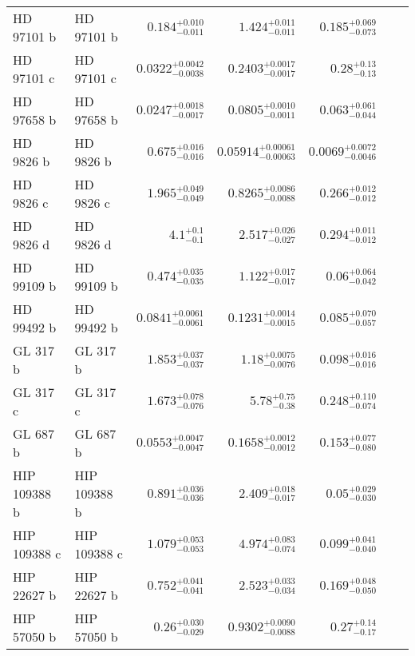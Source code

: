 \begin{longtable*}{llrrrrr}
HD 97101 b & HD 97101 b & $0.184^{+0.010}_{-0.011}$ & $1.424^{+0.011}_{-0.011}$ & $0.185^{+0.069}_{-0.073}$ & \cite{Dedrick et al. in prep} & \\ 
HD 97101 c & HD 97101 c & $0.0322^{+0.0042}_{-0.0038}$ & $0.2403^{+0.0017}_{-0.0017}$ & $0.28^{+0.13}_{-0.13}$ & \cite{Dedrick et al. in prep} & \\ 
HD 97658 b & HD 97658 b & $0.0247^{+0.0018}_{-0.0017}$ & $0.0805^{+0.0010}_{-0.0011}$ & $0.063^{+0.061}_{-0.044}$ & \cite{Howard11} & \\ 
HD 9826 b & HD 9826 b & $0.675^{+0.016}_{-0.016}$ & $0.05914^{+0.00061}_{-0.00063}$ & $0.0069^{+0.0072}_{-0.0046}$ & \cite{Butler97} & \\ 
HD 9826 c & HD 9826 c & $1.965^{+0.049}_{-0.049}$ & $0.8265^{+0.0086}_{-0.0088}$ & $0.266^{+0.012}_{-0.012}$ & \cite{Naef04} & \\ 
HD 9826 d & HD 9826 d & $4.1^{+0.1}_{-0.1}$ & $2.517^{+0.026}_{-0.027}$ & $0.294^{+0.011}_{-0.012}$ & \cite{Naef04} & \\ 
HD 99109 b & HD 99109 b & $0.474^{+0.035}_{-0.035}$ & $1.122^{+0.017}_{-0.017}$ & $0.06^{+0.064}_{-0.042}$ & \cite{Butler06} & \\ 
HD 99492 b & HD 99492 b & $0.0841^{+0.0061}_{-0.0061}$ & $0.1231^{+0.0014}_{-0.0015}$ & $0.085^{+0.070}_{-0.057}$ & \cite{Marcy05} & \\ 
GL 317 b & GL 317 b & $1.853^{+0.037}_{-0.037}$ & $1.18^{+0.0075}_{-0.0076}$ & $0.098^{+0.016}_{-0.016}$ & \cite{Johnson07b} & \\ 
GL 317 c & GL 317 c & $1.673^{+0.078}_{-0.076}$ & $5.78^{+0.75}_{-0.38}$ & $0.248^{+0.110}_{-0.074}$ & \cite{Anglada-Escude12} & \\ 
GL 687 b & GL 687 b & $0.0553^{+0.0047}_{-0.0047}$ & $0.1658^{+0.0012}_{-0.0012}$ & $0.153^{+0.077}_{-0.080}$ & \cite{Burt14} & \\ 
HIP 109388 b & HIP 109388 b & $0.891^{+0.036}_{-0.036}$ & $2.409^{+0.018}_{-0.017}$ & $0.05^{+0.029}_{-0.030}$ & \cite{Butler06_GJ849} & \\ 
HIP 109388 c & HIP 109388 c & $1.079^{+0.053}_{-0.053}$ & $4.974^{+0.083}_{-0.074}$ & $0.099^{+0.041}_{-0.040}$ & \cite{Feng15} & \\ 
HIP 22627 b & HIP 22627 b & $0.752^{+0.041}_{-0.041}$ & $2.523^{+0.033}_{-0.034}$ & $0.169^{+0.048}_{-0.050}$ & \cite{Howard10} & \\ 
HIP 57050 b & HIP 57050 b & $0.26^{+0.030}_{-0.029}$ & $0.9302^{+0.0090}_{-0.0088}$ & $0.27^{+0.14}_{-0.17}$ & \cite{Haghighipour10} & \\ 

\end{longtable*}
